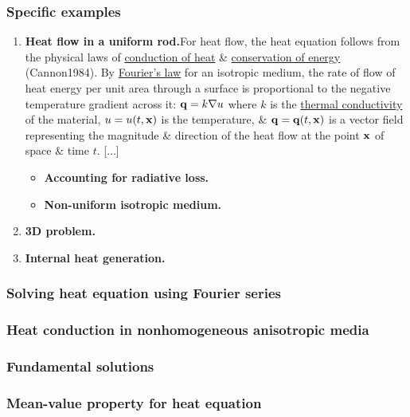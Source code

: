 \documentclass{article}
\begin{document}
\subsubsection{Specific examples}

\begin{enumerate}
	\item {\bf Heat flow in a uniform rod.}For heat flow, the heat equation follows from the physical laws of \href{https://en.wikipedia.org/wiki/Conduction_(heat)}{conduction of heat} \& \href{https://en.wikipedia.org/wiki/Conservation_of_energy}{conservation of energy} (Cannon1984). By \href{https://en.wikipedia.org/wiki/Thermal_conduction#Fourier's_law}{Fourier's law} for an isotropic medium, the rate of flow of heat energy per unit area through a surface is proportional to the negative temperature gradient across it: ${\bf q} = k\nabla u$ where $k$ is the \href{https://en.wikipedia.org/wiki/Thermal_conductivity}{thermal conductivity} of the material, $u = u(t,{\bf x})$ is the temperature, \& ${\bf q} = {\bf q}(t,{\bf x})$ is a vector field representing the magnitude \& direction of the heat flow at the point ${\bf x}$ of space \& time $t$. [$\ldots$]
	\begin{itemize}
		\item {\bf Accounting for radiative loss.}
		\item {\bf Non-uniform isotropic medium.}
	\end{itemize}
	\item {\bf3D problem.}
	\item {\bf Internal heat generation.}
\end{enumerate}

\subsubsection{Solving heat equation using Fourier series}

\subsubsection{Heat conduction in nonhomogeneous anisotropic media}

\subsubsection{Fundamental solutions}

\subsubsection{Mean-value property for heat equation}
\end{document}
